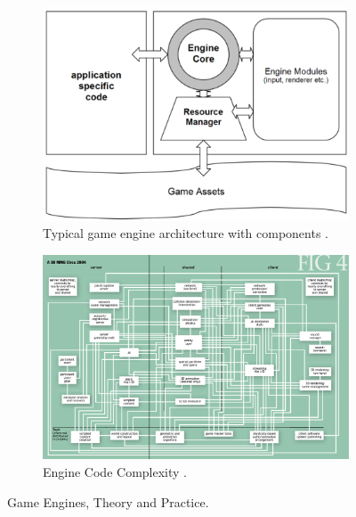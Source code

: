 \begin{figure}[H]
    \begin{subfigure}[b]{\textwidth}
        \includegraphics[width=\textwidth]{images/Game-development/Typical-game-engine.png}
        \caption{Typical game engine architecture with components \cite{5962102}.}
        \label{fig:typical-architecture}
    \end{subfigure}
    \begin{subfigure}[b]{\textwidth}
        \includegraphics[width=\textwidth]{images/blow-complexity.png}
        \caption{Engine Code Complexity \cite{blow2004game}.}
        \label{fig:engine-compl}
    \end{subfigure}
    \caption{Game Engines, Theory and Practice.}
    \label{fig:engine-theo-prac}
\end{figure}

